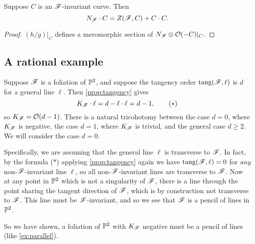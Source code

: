 \begin{proposition}
    Suppose $C$ is an $\scrF$-invariant curve. Then
    \begin{equation*}
        N_\scrF\cdot C = Z(\scrF,C) + C\cdot C.
    \end{equation*}
\end{proposition}

\begin{proof}
    $(h/g)|_C$ defines a meromorphic section of $N_\scrF\otimes\O(-C)|_C$.
\end{proof}

\subsection{A rational example}\label{sec:pencil}

Suppose $\scrF$ is a foliation of $\P^2$, and suppose the tangency order
$\tang(\scrF,\ell)$ is $d$ for a general line $\ell$. Then \cref{prop:tangency}
gives
\begin{equation*}
    K_\scrF\cdot\ell = d - \ell\cdot\ell = d - 1, \tag{$*$}
\end{equation*}
so $K_\scrF=\O(d-1)$. There is a natural tricohotomy between the case $d=0$,
where $K_\scrF$ is negative, the case $d=1$, where $K_\scrF$ is trivial, and the
general case $d\ge2$. We will consider the case $d=0$.

Specifically, we are assuming that the general line $\ell$ is transverse to
$\scrF$. In fact, by the formula ($*$) applying \cref{prop:tangency} again we
have $\tang(\scrF,\ell)=0$ for \emph{any} non-$\scrF$-invariant line $\ell$, so
all non-$\scrF$-invariant lines are transverse to $\scrF$. Now at any point in
$\P^2$ which is not a singularity of $\scrF$, there is a line through the point
sharing the tangent direction of $\scrF$, which is by construction not
transverse to $\scrF$. This line must be $\scrF$-invariant, and so we see that
$\scrF$ is a pencil of lines in $\P^2$.

So we have shown, a foliation of $\P^2$ with $K_\scrF$ negative must be a pencil
of lines (like \cref{ex:parallel}).
